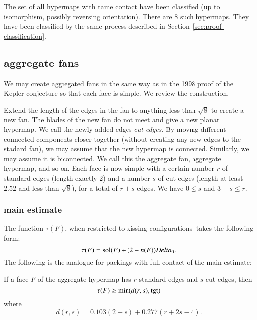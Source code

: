 The set of all hypermaps with tame contact have been classified (up to isomorphism, possibly reversing orientation).  There are $8$ such hypermaps.  They have been classified by the same process described in Section~\ref{sec:proof-classification}.


\subsection{aggregate fans}

We may create aggregated fans in the same way as in the 1998 proof of the Kepler conjecture so that each face is simple.  We review the construction. 

Extend the length of the edges in the fan to anything less than  $\sqrt8$ to create a new fan.  The blades of the new fan do not meet and give a new planar hypermap.  We call the newly added edges {\it cut edges}.  By moving different connected components closer together (without creating any new edges to the stadard fan), we may assume that the new hypermap is connected.  Similarly, we may assume it is biconnected.  We call this the aggregate fan, aggregate hypermap, and so on.   Each face is now simple with a certain number $r$ of standard edges (length exactly $2$) and a number $s$ of cut edges (length at least $2.52$ and less than $\sqrt8$), for a total of $r+s$ edges.  
We have $0\le s$ and $3-s \le r$.


\subsubsection{main estimate}

The function $\tau(F)$, when restricted to kissing configurations, takes the following form:
$$
\tau(F) = \operatorname{sol}(F) + (2-n(F)) Delta_0.
$$
The following is the analogue for packings with full contact of the main estimate:

\begin{theorem}\label{lemma:main-estimate-12}  If a face $F$ of the aggregate hypermap has $r$ standard edges and $s$ cut edges, then 
$$\tau(F) \ge \min(d(r,s),{\operatorname{tgt}})$$
where 
$$
d(r,s) = 0.103 (2-s) + 0.277 (r+2s-4).
$$
\end{theorem}

